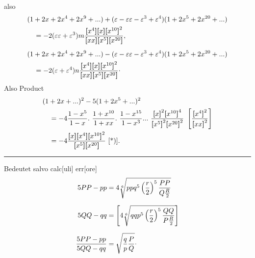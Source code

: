 \noindent also
\[\begin{aligned}
&(1+2x+2x^4+2x^9+{.}{.}{.})+(\varepsilon-\varepsilon\varepsilon-\varepsilon^3+\varepsilon^4)(1+2x^5+2x^{20}+{.}{.}{.})\\
&\quad=-2(\varepsilon\varepsilon+\varepsilon^3)m\frac{\TransBracket{x^4}\TransBracket{x}\TransBracket{x^{10}}^2}{\TransBracket{xx}\TransBracket{x^5}\TransBracket{x^{20}}},\\[5pt]
&(1+2x+2x^4+2x^9+{.}{.}{.})-(\varepsilon-\varepsilon\varepsilon-\varepsilon^3+\varepsilon^4)(1+2x^5+2x^{20}+{.}{.}{.})\\
&\quad=-2(\varepsilon+\varepsilon^4)n\frac{\TransBracket{x^4}\TransBracket{x}\TransBracket{x^{10}}^2}{\TransBracket{xx}\TransBracket{x^5}\TransBracket{x^{20}}}\mathpunct{\raisebox{.5ex}{.}}
\end{aligned}\]
\noindent Also Product
\[\begin{aligned}
&(1+2x+{.}{.}{.})^2-5(1+2x^5+{.}{.}{.})^2\\
&\quad=-4\frac{1-x^5}{1-x}.\ \frac{1+x^{10}}{1+xx}.\ \frac{1-x^{15}}{1-x^3}{.}{.}{.}\ \frac{\TransBracket{x}^2\TransBracket{x^{10}}^4}{\TransBracket{x^5}^2\TransBracket{x^{20}}^2}\ \left[\frac{\TransBracket{x^4}^2}{\TransBracket{xx}^2}\right]\\
&\quad=-4\frac{\TransBracket{x}\TransBracket{x^4}\TransBracket{x^{10}}^2}{\TransBracket{x^5}\TransBracket{x^{20}}}\ \text{[*)]}.
\end{aligned}\]
\par\smallskip\noindent\rule{.25\linewidth}{.4pt}\par
{\small
\par\indent [*)] Bedeutet salvo calc[uli] err[ore]
\[\begin{aligned}
5PP-pp&=4\sqrt[6]{ppq^5\left(\frac r2\right)^5\frac{PP}{Q\frac R2}}\\[6pt]
5QQ-qq&=\left[4\sqrt[6]{qqp^5\left(\frac r2\right)^5\frac{QQ}{P\frac R2}}\right]\\[6pt]
\frac{5PP-pp}{5QQ-qq}&=\sqrt{\frac qp\frac PQ}\mathpunct{\raisebox{.5ex}{.}}
\end{aligned}\]
\par}
\clearpage
\endgroup
